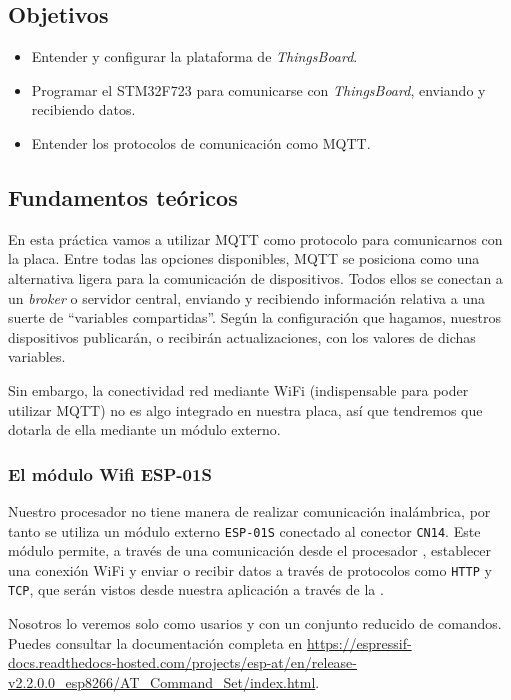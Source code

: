 \documentclass[../main.tex]{subfiles}
\begin{document}

    \subsection{Objetivos}
        \begin{itemize}
            \item Entender y configurar la plataforma de \emph{ThingsBoard}.
            \item Programar el STM32F723 para comunicarse con \emph{ThingsBoard}, enviando y recibiendo datos.
            \item Entender los protocolos de comunicación como MQTT.
        \end{itemize}

    \subsection{Fundamentos teóricos}
        
        En esta práctica vamos a utilizar MQTT como protocolo para comunicarnos con la placa. Entre todas las opciones disponibles, MQTT se posiciona como una alternativa ligera para la comunicación de dispositivos. Todos ellos se conectan a un \emph{broker} o servidor central, enviando y recibiendo información relativa a una suerte de ``variables compartidas''. Según la configuración que hagamos, nuestros dispositivos publicarán, o recibirán actualizaciones, con los valores de dichas variables.

        Sin embargo, la conectividad red mediante WiFi (indispensable para poder utilizar MQTT) no es algo integrado en nuestra placa, así que tendremos que dotarla de ella mediante un módulo externo.

        \subsubsection{El módulo Wifi ESP-01S}

            Nuestro procesador no tiene manera de realizar comunicación inalámbrica, por tanto se utiliza un módulo externo \texttt{ESP-01S} conectado al conector \texttt{CN14}. Este módulo permite, a través de una comunicación  desde el procesador \MCU, establecer una conexión WiFi y enviar o recibir datos a través de protocolos como \texttt{HTTP} y \texttt{TCP}, que serán vistos desde nuestra aplicación a través de la . 

            Nosotros lo veremos solo como usarios y con un conjunto reducido de comandos. Puedes consultar la documentación completa en \url{https://espressif-docs.readthedocs-hosted.com/projects/esp-at/en/release-v2.2.0.0_esp8266/AT_Command_Set/index.html}.
        
\end{document}
